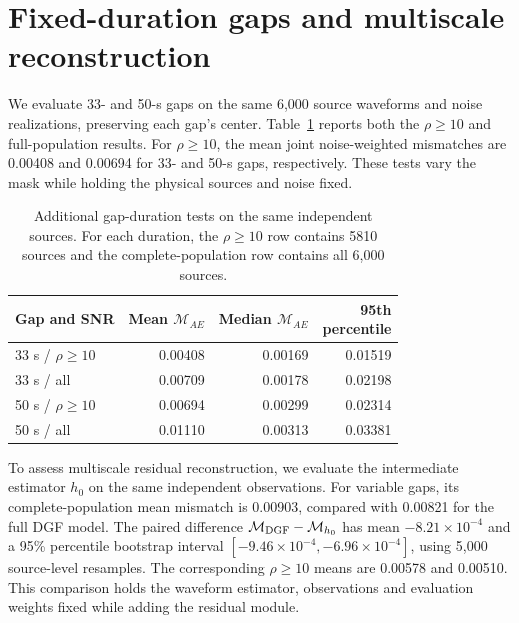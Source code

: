 \documentclass[10pt,prd,aps,a4paper,twocolumn,superscriptaddress,nofootinbib,floatfix]{revtex4-2}
\begin{document}
\section{Fixed-duration gaps and multiscale reconstruction}\label{app:fixed_gaps}
We evaluate 33- and 50-s gaps on the same 6,000 source waveforms and noise realizations, preserving each gap's center. Table~\ref{tab:fixed_gaps} reports both the $\rho\ge10$ and full-population results. For $\rho\ge10$, the mean joint noise-weighted mismatches are 0.00408 and 0.00694 for 33- and 50-s gaps, respectively. These tests vary the mask while holding the physical sources and noise fixed.
\begin{table}[t]\centering\setlength{\tabcolsep}{2pt}
\caption{Additional gap-duration tests on the same independent sources. For each duration, the $\rho\ge10$ row contains 5810 sources and the complete-population row contains all 6,000 sources.}\label{tab:fixed_gaps}
\begin{tabular}{lrrr}\hline\hline
Gap and SNR & Mean $\mathcal M_{AE}$ & Median $\mathcal M_{AE}$ & \shortstack{95th\\percentile}\\\hline
33 s / $\rho\ge10$ & 0.00408 & 0.00169 & 0.01519\\
33 s / all & 0.00709 & 0.00178 & 0.02198\\
50 s / $\rho\ge10$ & 0.00694 & 0.00299 & 0.02314\\
50 s / all & 0.01110 & 0.00313 & 0.03381\\
\hline\hline\end{tabular}\end{table}

To assess multiscale residual reconstruction, we evaluate the intermediate estimator $h_0$ on the same independent observations. For variable gaps, its complete-population mean mismatch is 0.00903, compared with 0.00821 for the full DGF model. The paired difference $\mathcal M_{\rm DGF}-\mathcal M_{h_0}$ has mean $-8.21\times10^{-4}$ and a 95\% percentile bootstrap interval $[-9.46\times10^{-4},-6.96\times10^{-4}]$, using 5,000 source-level resamples. The corresponding $\rho\ge10$ means are 0.00578 and 0.00510. This comparison holds the waveform estimator, observations and evaluation weights fixed while adding the residual module.
\end{document}

